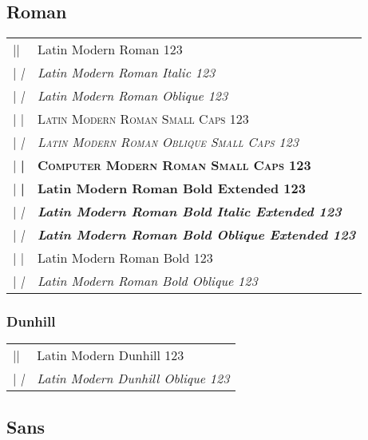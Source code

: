 \documentclass{article}
\makeatletter
\newenvironment{vrb}{\begin{tabular}{@{}p{6cm}l@{}}}{\end{tabular}}
\makeatother
\begin{document}
\subsection*{Roman}

\rmfamily
\begin{vrb}
|\rmfamily| & {Latin Modern Roman 123} \\
|   \itshape| & {\itshape Latin Modern Roman Italic 123} \\
|   \slshape| & {\slshape Latin Modern Roman Oblique 123} \\
|   \scshape| & {\scshape Latin Modern Roman Small Caps 123} \\
|     \slshape| & {\scshape\slshape Latin Modern Roman Oblique Small Caps 123} \\
|     \bfseries| & {\bfseries\scshape Computer Modern Roman Small Caps 123} \\
|   \bfseries| & {\bfseries Latin Modern Roman Bold Extended 123} \\
|      \itshape| & {\bfseries\itshape Latin Modern Roman Bold Italic Extended 123} \\
|      \slshape| & {\bfseries\slshape Latin Modern Roman Bold Oblique Extended 123} \\
|   \fontseries{b}\selectfont| & {\fontseries{b}\selectfont Latin Modern Roman Bold 123} \\
|      \slshape| & {\fontseries{b}\slshape Latin Modern Roman Bold Oblique 123} \\
\end{vrb}

\subsubsection*{Dunhill}

\tistyle
\begin{vrb}
|\tistyle | & {Latin Modern Dunhill 123} \\
|   \slshape| & {\slshape Latin Modern Dunhill Oblique 123} \\
\end{vrb}

\subsection*{Sans}
\end{document}
